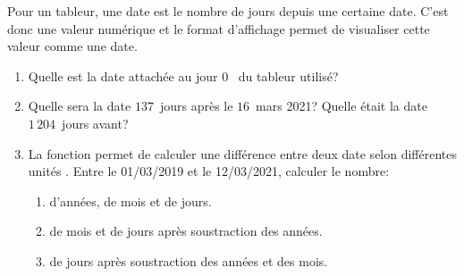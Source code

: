 \documentclass[a4paper, twoside, 11pt]{article}
\begin{document}
\begin{exercise}
  Pour un tableur, une date est le nombre de jours depuis une certaine date. C'est donc une valeur numérique et le format d'affichage permet de visualiser cette valeur comme une date.
  \begin{enumerate}
    \item Quelle est la date attachée au \og jour $0$ \fg\ du tableur utilisé?
    \item Quelle sera la date $137$~jours après le $16$~mars 2021? Quelle était la date $1\,204$~jours avant?
    \item La fonction  permet de calculer une différence entre deux date selon différentes \og unités \fg. Entre le 01/03/2019 et le 12/03/2021, calculer le nombre:
    \begin{enumerate}
      \item d'années, de mois et de jours.
      \item de mois et de jours après soustraction des années.
      \item de jours après soustraction des années et des mois.
    \end{enumerate}
  \end{enumerate}
\end{exercise}
\end{document}
